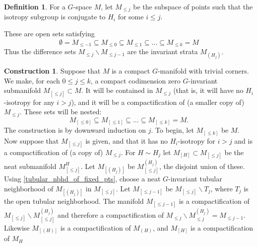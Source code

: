 \documentclass[11pt]{amsart}
\theoremstyle{definition}
\newtheorem{defn}{Definition}[section]
\newtheorem{con}{Construction}[section]
\numberwithin{equation}{section}
\numberwithin{figure}{section}
\begin{document}
\begin{defn}\label{defn_strata_uncompactified}
For a $G$-space $M$, let $M_{\leq j}$ be the subspace of points such that the isotropy subgroup is conjugate to $H_i$ for some $i\le j$. %
\end{defn}
These are open sets satisfying
$$
\emptyset = M_{\leq -1} \subseteq M_{\leq 0}\subseteq M_{\leq 1}\subseteq \dots \subseteq M_{\leq k} = M
$$
Thus the difference sets $M_{\le j}\backslash M_{\le j-1}$ are the invariant strata $M_{(H_j)}$.
\begin{con}\label{defn_strata}
Suppose that $M$ is a compact $G$-manifold with trivial corners. We make, for each $0\le j\le k$, a compact codimension zero $G$-invariant submanifold $M_{[\le j]}\subset M$. It will be contained in $M_{\le j}$ (that is, it will have no $H_i$-isotropy for any $i>j$), and it will be a compactification of (a smaller copy of) $M_{\le j}$. These sets will be nested:
$$
 M_{[\leq 0]}\subseteq M_{[\leq 1]}\subseteq \dots \subseteq M_{[\leq k]} = M.
$$
The construction is by downward induction on $j$. To begin, let $M_{[\le k]}$ be $M$. Now suppose that $M_{[\le j]}$ is given, and that it has no $H_i$-isotropy for $i>j$ and is a compactification of (a copy of) $M_{\le j}$. For $H\sim H_j$ let $M_{[H]}\subset M_{[\le j]}$ be the neat submanifold $M_{[\le j]}^{H}$. Let $M_{[(H_j)]}$ be $M_{[\le j]}^{(H_j)}$, the disjoint union of these. Using \autoref{tubular_nbhd_of_fixed_pts}, choose a neat $G$-invariant tubular neighborhood of $M_{[(H_j)]}$ in $M_{[\le j]}$. Let $M_{[\le j-1]}$ be $M_{[\le j]}\backslash T_j$, where $T_j$ is the open tubular neighborhood. The manifold $M_{[\le j-1]}$ is a compactification of $M_{[\le j]}\backslash M_{[\le j]}^{(H_j)}$ and therefore a compactification of $M_{\le j}\backslash M_{\le j}^{(H_j)}=M_{\le j-1}$. Likewise $M_{[(H)]}$ is a compactification of $M_{(H)}$, and $M_{[H]}$ is a compactification of $M_{H}$



\end{con}
\end{document}
